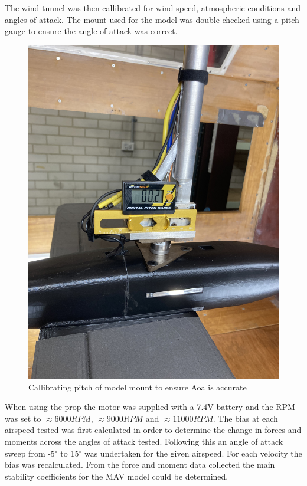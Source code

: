 The wind tunnel was then callibrated for wind speed, atmospheric conditions and angles of attack. The mount used for the model was double checked using a pitch gauge to ensure the angle of attack was correct. 
\begin{figure}[H]
    \centering
    \includegraphics[scale=0.05]{04_Methodology/Figs/pitchGauge.jpg}
    \caption{Callibrating pitch of model mount to ensure Aoa is accurate}
    \label{fig:pitchGauge}
\end{figure}

When using the prop the motor was supplied with a 7.4V battery and the RPM was set to $\approx 6000 RPM$, $\approx 9000RPM$ and $\approx 11000 RPM$. The bias at each airspeed tested was first calculated in order to determine the change in forces and moments across the angles of attack tested. Following this an angle of attack sweep from -5$^{\circ}$ to 15$^{\circ}$ was undertaken for the given airspeed. For each velocity the bias was recalculated. From the force and moment data collected the main stability coefficients for the MAV model could be determined.



